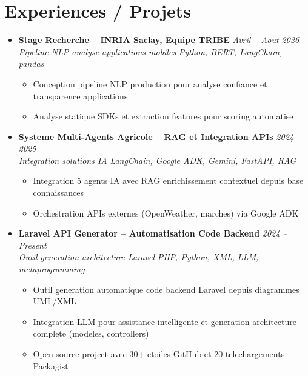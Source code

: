 \documentclass[a4paper,11pt]{article}
\begin{document}
\section{Experiences / Projets}
\begin{itemize}[leftmargin=*, label={-}]

\item \textbf{Stage Recherche -- INRIA Saclay, Equipe TRIBE} \hfill \textit{Avril -- Aout 2026} \\
\textit{Pipeline NLP analyse applications mobiles} \hfill \textit{Python, BERT, LangChain, pandas}
\vspace{-2pt}
    \begin{itemize}[leftmargin=0.4cm, nosep, label=\tiny$\bullet$]
        \item \small{Conception pipeline NLP production pour analyse confiance et transparence applications}
        \item \small{Analyse statique SDKs et extraction features pour scoring automatise}
    \end{itemize}
\vspace{3pt}

\item \textbf{Systeme Multi-Agents Agricole -- RAG et Integration APIs} \hfill \textit{2024 -- 2025} \\
\textit{Integration solutions IA} \hfill \textit{LangChain, Google ADK, Gemini, FastAPI, RAG}
\vspace{-2pt}
    \begin{itemize}[leftmargin=0.4cm, nosep, label=\tiny$\bullet$]
        \item \small{Integration 5 agents IA avec RAG enrichissement contextuel depuis base connaissances}
        \item \small{Orchestration APIs externes (OpenWeather, marches) via Google ADK}
    \end{itemize}
\vspace{3pt}

\item \textbf{Laravel API Generator -- Automatisation Code Backend} \hfill \textit{2024 -- Present} \\
\textit{Outil generation architecture Laravel} \hfill \textit{PHP, Python, XML, LLM, metaprogramming}
\vspace{-2pt}
    \begin{itemize}[leftmargin=0.4cm, nosep, label=\tiny$\bullet$]
        \item \small{Outil generation automatique code backend Laravel depuis diagrammes UML/XML}
        \item \small{Integration LLM pour assistance intelligente et generation architecture complete (modeles, controllers)}
        \item \small{Open source project avec 30+ etoiles GitHub et 20 telechargements Packagist}
    \end{itemize}
\vspace{3pt}


\end{itemize}
\end{document}
